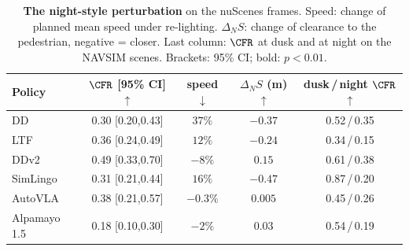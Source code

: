 \begin{table}[t]
\centering
\caption{\textbf{The night-style perturbation} on the nuScenes frames. Speed: change of planned mean speed under re-lighting. $\Delta_N S$: change of clearance to the pedestrian, negative = closer. Last column: $\CFR$ at dusk and at night on the \NumDuskN{} NAVSIM scenes. Brackets: 95\% CI; bold: $p<0.01$.}
\label{tab:light}
\scriptsize
\setlength{\tabcolsep}{1.6pt}
\begin{tabular}{@{}lcccc@{}}
\toprule
Policy & $\CFR$ [95\% CI] $\uparrow$ & speed $\downarrow$ & $\Delta_N S$ (m) $\uparrow$ & dusk\,/\,night $\CFR$ $\uparrow$ \\
\midrule
DD & 0.30 {\scriptsize[0.20,0.43]} & \textbf{\boldmath $37\%$} & \textbf{\boldmath $-0.37$} & 0.52\,/\,0.35 \\
LTF & 0.36 {\scriptsize[0.24,0.49]} & \textbf{\boldmath $12\%$} & \textbf{\boldmath $-0.24$} & 0.34\,/\,0.15 \\
DDv2 & 0.49 {\scriptsize[0.33,0.70]} & \textbf{\boldmath $-8\%$} & \textbf{\boldmath $0.15$} & 0.61\,/\,0.38 \\
SimLingo & 0.31 {\scriptsize[0.21,0.44]} & \textbf{\boldmath $16\%$} & \textbf{\boldmath $-0.47$} & 0.87\,/\,0.20 \\
AutoVLA & 0.38 {\scriptsize[0.21,0.57]} & $-0.3\%$ & $0.005$ & 0.45\,/\,0.26 \\
Alpamayo 1.5 & 0.18 {\scriptsize[0.10,0.30]} & $-2\%$ & $0.03$ & 0.54\,/\,0.19 \\
\bottomrule
\end{tabular}
\end{table}
